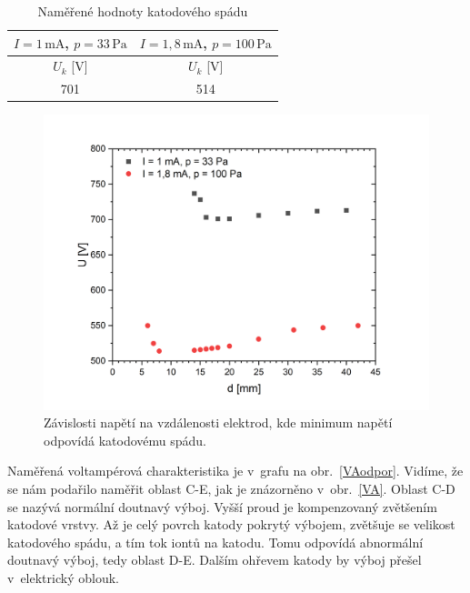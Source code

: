 \documentclass[a4paper,12pt]{article}
\begin{document}
	  


\begin{center}
	\begin{table}[h!]
		\centering
		\caption{Naměřené hodnoty katodového spádu}
		\label{tab2}
		\begin{tabular}{|c|c|} \hline
			$I = 1\,\si{\milli\ampere}$, $p = 33\,\si{\pascal}$ 
			& $I = 1,8\,\si{\milli\ampere}$, $p = 100\,\si{\pascal}$\\ \hline
			$U_k$ [V] & $U_k$ [V]\\ \hline
			701 & 514 \\ \hline
			
		\end{tabular}
	\end{table}
\end{center}

\begin{figure}[h!]
	\centering
	\includegraphics[width=145mm]{KatodovySpad.png}
	\caption{Závislosti napětí na vzdálenosti elektrod, kde minimum napětí odpovídá katodovému spádu.}
	\label{KatodovySpad}
\end{figure}

\newpage
Naměřená voltampérová charakteristika je v~grafu na obr.~\ref{VAodpor}. Vidíme, 
že se nám podařilo naměřit oblast C-E, jak je znázorněno v~obr.~\ref{VA}. 
Oblast C-D se nazývá normální doutnavý výboj. Vyšší proud je kompenzovaný 
zvětšením katodové vrstvy. Až je celý povrch katody pokrytý výbojem, zvětšuje 
se velikost katodového spádu, a tím tok iontů na katodu. Tomu odpovídá 
abnormální doutnavý výboj, tedy oblast D-E. Dalším ohřevem katody by výboj 
přešel v~elektrický oblouk.
\end{document}
